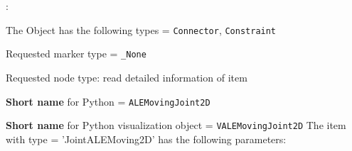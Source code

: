 \noindent {}:
\bi
  \item The Object has the following types = \texttt{Connector}, \texttt{Constraint}
  \item Requested marker type = \texttt{\_None}
  \item Requested node type: read detailed information of item
  \item {\bf Short name} for Python = \texttt{ALEMovingJoint2D}
  \item {\bf Short name} for Python visualization object = \texttt{VALEMovingJoint2D}
\ei\vspace{12pt} \noindent 
The item  with type = 'JointALEMoving2D' has the following parameters:
\vspace{-0.5cm}\\
\vspace{-0.5cm}\\

